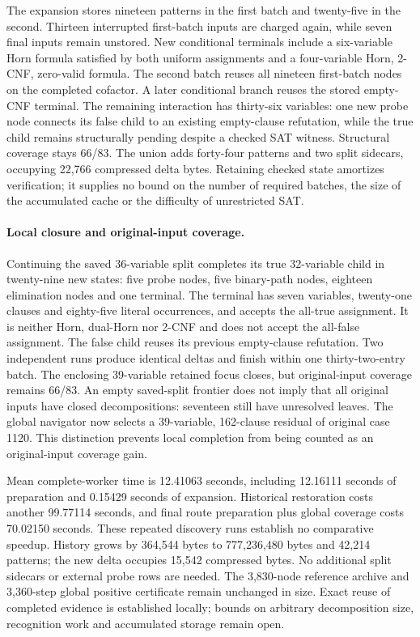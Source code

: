 \documentclass[11pt,a4paper]{article}
\numberwithin{equation}{section}
\theoremstyle{plain}
\theoremstyle{definition}
\theoremstyle{remark}
\begin{document}
The expansion stores nineteen patterns in the first batch and twenty-five in the second. Thirteen interrupted first-batch inputs are charged again, while seven final inputs remain unstored. New conditional terminals include a six-variable Horn formula satisfied by both uniform assignments and a four-variable Horn, 2-CNF, zero-valid formula. The second batch reuses all nineteen first-batch nodes on the completed cofactor. A later conditional branch reuses the stored empty-CNF terminal. The remaining interaction has thirty-six variables: one new probe node connects its false child to an existing empty-clause refutation, while the true child remains structurally pending despite a checked SAT witness. Structural coverage stays 66/83. The union adds forty-four patterns and two split sidecars, occupying 22,766 compressed delta bytes. Retaining checked state amortizes verification; it supplies no bound on the number of required batches, the size of the accumulated cache or the difficulty of unrestricted SAT.

\paragraph{Local closure and original-input coverage.}
Continuing the saved 36-variable split completes its true 32-variable child in twenty-nine new states: five probe nodes, five binary-path nodes, eighteen elimination nodes and one terminal. The terminal has seven variables, twenty-one clauses and eighty-five literal occurrences, and accepts the all-true assignment. It is neither Horn, dual-Horn nor 2-CNF and does not accept the all-false assignment. The false child reuses its previous empty-clause refutation. Two independent runs produce identical deltas and finish within one thirty-two-entry batch. The enclosing 39-variable retained focus closes, but original-input coverage remains 66/83. An empty saved-split frontier does not imply that all original inputs have closed decompositions: seventeen still have unresolved leaves. The global navigator now selects a 39-variable, 162-clause residual of original case 1120. This distinction prevents local completion from being counted as an original-input coverage gain.

Mean complete-worker time is 12.41063 seconds, including 12.16111 seconds of preparation and 0.15429 seconds of expansion. Historical restoration costs another 99.77114 seconds, and final route preparation plus global coverage costs 70.02150 seconds. These repeated discovery runs establish no comparative speedup. History grows by 364,544 bytes to 777,236,480 bytes and 42,214 patterns; the new delta occupies 15,542 compressed bytes. No additional split sidecars or external probe rows are needed. The 3,830-node reference archive and 3,360-step global positive certificate remain unchanged in size. Exact reuse of completed evidence is established locally; bounds on arbitrary decomposition size, recognition work and accumulated storage remain open.
\end{document}
